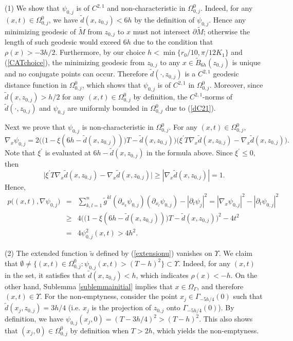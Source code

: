 \documentclass[11pt,letterpaper]{amsart}
\numberwithin{equation}{section}
\theoremstyle{definition}
\theoremstyle{plain}
\theoremstyle{definition}
\theoremstyle{plain}
\theoremstyle{definition}
\theoremstyle{plain}
\begin{document}
\medskip
\noindent (1) We show that $\psi_{0,j}$ is of $C^{2,1}$ and non-characteristic in $\Omega^0_{0,j}$. Indeed, for any $(x,t)\in \Omega^0_{0,j}$, we have $\widetilde{d}(x,z_{0,j})< 6h$ by the definition of $\psi_{0,j}$. Hence any minimizing geodesic of $\widetilde{M}$ from $z_{0,j}$ to $x$ must not intersect $\partial \widetilde{M}$; otherwise the length of such geodesic would exceed $6h$ due to the condition that $\rho(x)>-3h/2$. Furthermore, by our choice $h<\min\{r_0/10,\pi/12K_1\}$ and (\ref{CATchoice}), the minimizing geodesic from $z_{0,j}$ to any $x\in \widetilde{B}_{6h}(z_{0,j})$ is unique and no conjugate points can occur. Therefore $\widetilde{d}(\cdot,z_{0,j})$ is a $C^{2,1}$ geodesic distance function in $\Omega^0_{0,j}$, which shows that $\psi_{0,j}$ is of $C^{2,1}$ in $\Omega^0_{0,j}$. Moreover, since $\widetilde{d}(x,z_{0,j})>h/2$ for any $(x,t)\in \Omega^0_{0,j}$ by definition, the $C^{2,1}$-norms of $\widetilde{d}(\cdot,z_{0,j})$ and $\psi_{0,j}$ are uniformly bounded in $\Omega^0_{0,j}$ due to (\ref{dC21}).

Next we prove that $\psi_{0,j}$ is non-characteristic in $\Omega^0_{0,j}$. For any $(x,t)\in \Omega^0_{0,j}$,
$$\nabla_x \psi_{0,j}=2\Big(\big(1-\xi(6h-\widetilde{d}(x,z_{0,j}))\big)T-\widetilde{d}(x,z_{0,j})\Big) \big(\xi^{\prime}T\nabla_x\widetilde{d}(x,z_{0,j})-\nabla_x\widetilde{d}(x,z_{0,j}) \big).$$
Note that $\xi^{\prime}$ is evaluated at $6h-\widetilde{d}(x,z_{0,j})$ in the formula above. Since $\xi^{\prime}\leqslant 0$, then
$$\big|\xi^{\prime}T\nabla_x\widetilde{d}(x,z_{0,j})-\nabla_x\widetilde{d}(x,z_{0,j}) \big|\geqslant  |\nabla_x\widetilde{d}(x,z_{0,j})|=1.$$
Hence,
\begin{eqnarray*}
p \big((x,t),\nabla \psi_{0,j} \big) &=& \sum_{k,l=1}^n \widetilde{g}^{kl} (\partial_{x_k}\psi_{0,j})( \partial_{x_l}\psi_{0,j})-|\partial_t\psi_j|^2 =|\nabla_x \psi_{0,j}|^2-|\partial_t \psi_{0,j}|^2 \nonumber\\
&\geqslant& 4\Big(\big(1-\xi(6h-\widetilde{d}(x,z_{0,j}))\big)T-\widetilde{d}(x,z_{0,j})\Big)^2-4t^2 \nonumber \\
&=& 4\psi_{0,j}^2(x,t) > 4h^2.
\end{eqnarray*}

\noindent (2) The extended function $\widetilde{u}$ defined by (\ref{extensionu}) vanishes on $\Upsilon$. We claim that $\emptyset\neq\{(x,t)\in \Omega^0_{0,j}: \psi_{0,j}(x,t) > (T-h)^2\}\subset \Upsilon$. Indeed, for any $(x,t)$ in the set, it satisfies that $\widetilde{d}(x,z_{0,j})<h$, which indicates $\rho(x)<-h$. On the other hand, Sublemma \ref{sublemmainitial} implies that $x\in \Omega_{\Gamma}$, and therefore $(x,t)\in \Upsilon$. For the non-emptyness, consider the point $x_j\in \Gamma_{-5h/4}(0)$ such that $\widetilde{d}(x_j,z_{0,j})=3h/4$ (i.e. $x_j$ is the projection of $z_{0,j}$ onto $\Gamma_{-5h/4}(0)$). By definition, we have $\psi_{0,j}(x_j,0)=(T-3h/4)^2>(T-h)^2$. This also shows that $(x_j,0)\in \Omega_{0,j}^0$ by definition when $T>2h$, which yields the non-emptyness.
\end{document}
